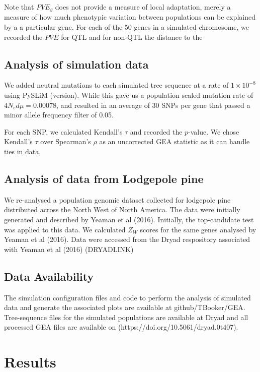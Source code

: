 \documentclass[11pt,twoside,lineno]{GSA_format}
\begin{document}
Note that $PVE_g$ does not provide a measure of local adaptation, merely a measure of how much phenotypic variation between populations can be explained by a a particular gene. 
For each of the 50 genes in a simulated chromosome, we recorded the $PVE$ for QTL and for non-QTL the distance to the 

\subsection{Analysis of simulation data}

We added neutral mutations to each simulated tree sequence at a rate of $1\times10^{-8}$ using PySLiM (version). While this gave us a population scaled mutation rate of $4N_ed\mu = 0.00078$, and resulted in an average of 30 SNPs per gene that passed a minor allele frequency filter of 0.05.

For each SNP, we calculated Kendall's $\tau$ and recorded the $p$-value. We chose Kendall's $\tau$ over Spearman's $\rho$ as an uncorrected GEA statistic as it can handle ties in data, 


\subsection{Analysis of data from Lodgepole pine}

We re-analysed a population genomic dataset collected for lodgepole pine distributed across the North West of North America. The data were initially generated and described by Yeaman et al (2016). Initially, the top-candidate test was applied to this data. We calculated $Z_W$ scores for the same genes analysed by Yeaman et al (2016). Data were accessed from the Dryad respository associated with Yeaman et al (2016) (DRYADLINK)

\subsection{Data Availability}

The simulation configuration files and code to perform the analysis of simulated data and generate the associated plots are available at github/TBooker/GEA. Tree-sequence files for the simulated populations are available at Dryad and all processed GEA files are available on (https://doi.org/10.5061/dryad.0t407). 

\section{Results}
\end{document}
